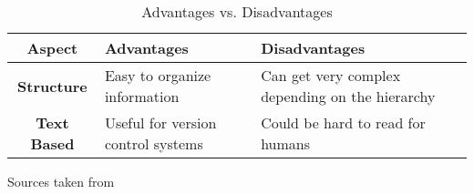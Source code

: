 \begin{table}[hb]
    \begin{tabulary}{\textwidth}{cLL}
        \toprule
     \textbf{Aspect} & \textbf{ Advantages} & \textbf{ Disadvantages} \\
        \midrule
   \textbf{ Structure} & Easy to organize information & Can get very complex depending on the hierarchy \\
        \midrule
  \textbf{Text Based} & Useful for version control systems & Could be hard to read for humans \\
    \bottomrule
    \end{tabulary}
    \caption{Advantages vs. Disadvantages}\label{table:advantages_disadvantages}
\end{table}

Sources taken from~\autocites{wiki_apache_ant}{apacheorg_apache_ant}{kinook_visual_build}{wiki_visual_build}
